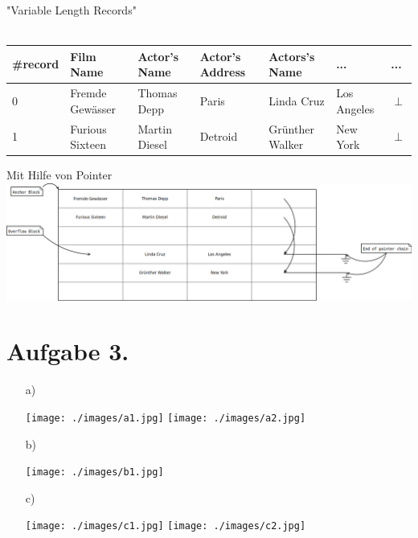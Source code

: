 \begin{enumerate}
    "Variable Length Records" \\ \\
    \begin{tabular}{| l | l | l | l | l | l | l |}
    \hline
    \#record & Film Name & Actor's Name & Actor's Address & Actors's Name & ... & ... \\ \hline
    0 & Fremde Gewässer & Thomas Depp & Paris & Linda Cruz & Los Angeles & $\perp$ \\ \hline
    1 & Furious Sixteen & Martin Diesel & Detroid & Grünther Walker & New York & $\perp$ \\ \hline
    \end{tabular}

    Mit Hilfe von Pointer \\

    \includegraphics[width=\textwidth]{pointerRepresentation.png}

\end{enumerate}

\section*{Aufgabe 3.}

\begin{enumerate}

\item[a)]

\texttt{[image: ./images/a1.jpg]}
\texttt{[image: ./images/a2.jpg]}

\item[b)]

\texttt{[image: ./images/b1.jpg]}

\item[c)]

\texttt{[image: ./images/c1.jpg]}
\texttt{[image: ./images/c2.jpg]}

\end{enumerate}


